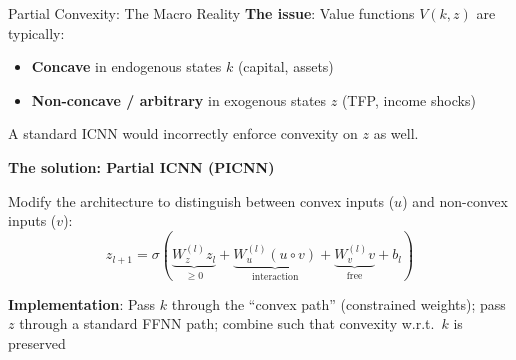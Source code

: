 \documentclass[10pt,english,aspectratio=169]{beamer}
\begin{document}
\begin{frame}{Partial Convexity: The Macro Reality}
\textbf{The issue}: Value functions $V(k, z)$ are typically:
\begin{itemize}
  \item \textbf{Concave} in endogenous states $k$ (capital, assets)
  \item \textbf{Non-concave / arbitrary} in exogenous states $z$ (TFP, income shocks)
\end{itemize}
A standard ICNN would incorrectly enforce convexity on $z$ as well.

\vspace{0.3cm}
\textbf{The solution: Partial ICNN (PICNN)}

Modify the architecture to distinguish between convex inputs ($u$) and non-convex inputs ($v$):
\[
  z_{l+1} = \sigma\left(\underbrace{W_z^{(l)} z_l}_{\geq 0} + \underbrace{W_u^{(l)}(u \circ v)}_{\text{interaction}} + \underbrace{W_v^{(l)} v}_{\text{free}} + b_l\right)
\]

\textbf{Implementation}: Pass $k$ through the ``convex path'' (constrained weights); pass $z$ through a standard FFNN path; combine such that convexity w.r.t.\ $k$ is preserved
\end{frame}
\end{document}
